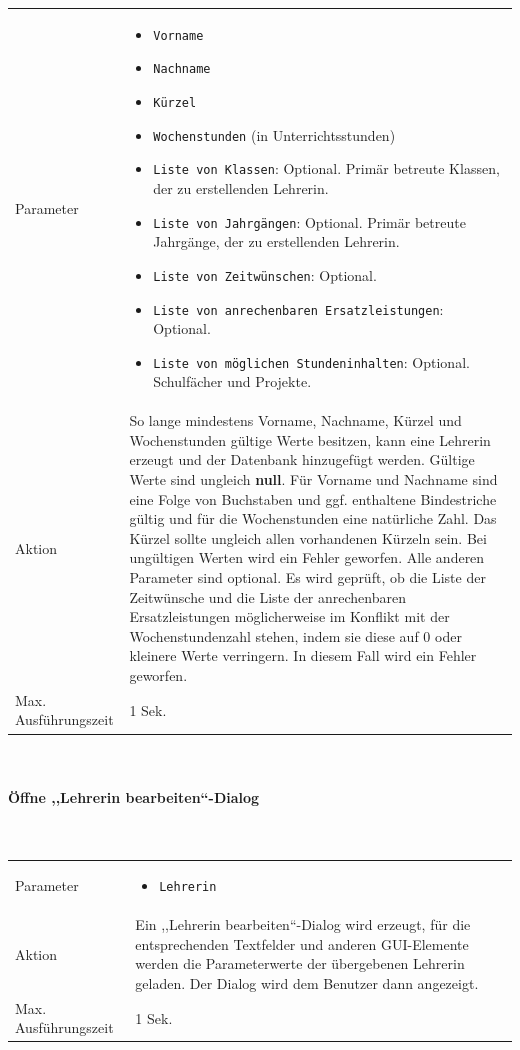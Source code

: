 \documentclass[fontsize=12pt,paper=a4,twoside]{scrartcl}
\begin{document}
\hypertarget{par:LehrerinHinzufuegen}{
\begin{tabularx}{\textwidth}{p{4cm}X}
Parameter & \begin{itemize}[itemsep=0pt, leftmargin = 0.5cm]
			\item \texttt{Vorname}
			\item \texttt{Nachname}
			\item \texttt{Kürzel}
			\item \texttt{Wochenstunden} (in Unterrichtsstunden)
			\item \texttt{Liste von Klassen}: Optional. Primär betreute Klassen, der zu erstellenden Lehrerin.
			\item \texttt{Liste von Jahrgängen}: Optional. Primär betreute Jahrgänge, der zu erstellenden Lehrerin.
			\item \texttt{Liste von Zeitwünschen}: Optional.
			\item \texttt{Liste von anrechenbaren Ersatzleistungen}: Optional.
			\item \texttt{Liste von möglichen Stundeninhalten}: Optional. Schulfächer und Projekte.
			\end{itemize}\\
Aktion &  So lange mindestens Vorname, Nachname, Kürzel und Wochenstunden gültige Werte besitzen, kann eine Lehrerin erzeugt und der Datenbank hinzugefügt werden. Gültige Werte sind ungleich \textbf{null}. Für Vorname und Nachname sind eine Folge von Buchstaben und ggf. enthaltene Bindestriche gültig und für die Wochenstunden eine natürliche Zahl. Das Kürzel sollte ungleich allen vorhandenen Kürzeln sein.  Bei ungültigen Werten wird ein Fehler geworfen. Alle anderen Parameter sind optional. Es wird geprüft, ob die Liste der Zeitwünsche und die Liste der anrechenbaren Ersatzleistungen möglicherweise im Konflikt mit der Wochenstundenzahl stehen, indem sie diese auf 0 oder kleinere Werte verringern. In diesem Fall wird ein Fehler geworfen.  \\
Max. Ausführungszeit & 1 Sek. 
\end{tabularx}}\\


\paragraph{Öffne ,,Lehrerin bearbeiten``-Dialog}\mbox{}\\

\begin{tabularx}{\textwidth}{p{4cm}X}
Parameter & \begin{itemize}[itemsep=0pt, leftmargin = 0.5cm]
			\item \texttt{Lehrerin}
			\end{itemize}\\
Aktion & Ein ,,Lehrerin bearbeiten``-Dialog wird erzeugt, für die entsprechenden Textfelder und anderen GUI-Elemente werden die Parameterwerte der übergebenen Lehrerin geladen. Der Dialog wird dem Benutzer dann angezeigt.\\
Max. Ausführungszeit & 1 Sek.
\end{tabularx}\\
\end{document}
